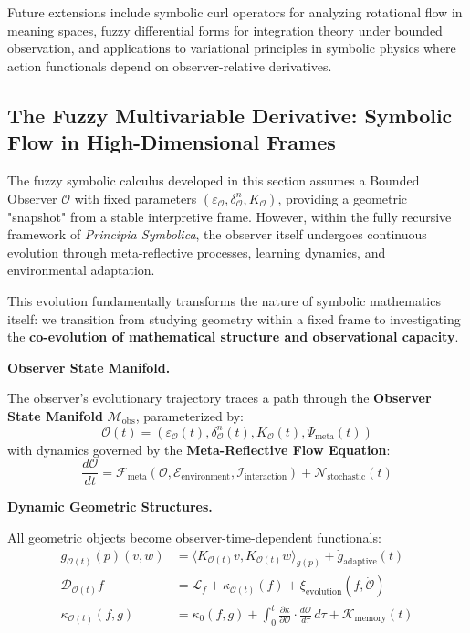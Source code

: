 Future extensions include symbolic curl operators for analyzing rotational flow in meaning spaces, fuzzy differential forms for integration theory under bounded observation, and applications to variational principles in symbolic physics where action functionals depend on observer-relative derivatives.\subsection{The Fuzzy Multivariable Derivative: Symbolic Flow in High-Dimensional Frames}

\begin{scholium}
\label{scholium:bk4_dynamics_of_observer_frame}

The fuzzy symbolic calculus developed in this section assumes a Bounded Observer $\mathcal{O}$ with fixed parameters $(\varepsilon_{\mathcal{O}}, \delta_{\mathcal{O}}^n, K_{\mathcal{O}})$, providing a geometric "snapshot" from a stable interpretive frame. However, within the fully recursive framework of \textit{Principia Symbolica}, the observer itself undergoes continuous evolution through meta-reflective processes, learning dynamics, and environmental adaptation.

This evolution fundamentally transforms the nature of symbolic mathematics itself: we transition from studying geometry within a fixed frame to investigating the \textbf{co-evolution of mathematical structure and observational capacity}.

\vspace{1em}
\noindent\textbf{Observer State Manifold.}

The observer's evolutionary trajectory traces a path through the \textbf{Observer State Manifold} $\mathcal{M}_{\text{obs}}$, parameterized by:
\[
\mathcal{O}(t) = (\varepsilon_{\mathcal{O}}(t), \delta_{\mathcal{O}}^n(t), K_{\mathcal{O}}(t), \Psi_{\text{meta}}(t))
\]
with dynamics governed by the \textbf{Meta-Reflective Flow Equation}:
\[
\frac{d\mathcal{O}}{dt} = \mathcal{F}_{\text{meta}}(\mathcal{O}, \mathcal{E}_{\text{environment}}, \mathcal{I}_{\text{interaction}}) + \mathcal{N}_{\text{stochastic}}(t)
\]

\vspace{1em}
\noindent\textbf{Dynamic Geometric Structures.}

All geometric objects become observer-time-dependent functionals:
\begin{align*}
g_{\mathcal{O}(t)}(p)(v,w) &= \langle K_{\mathcal{O}(t)} v, K_{\mathcal{O}(t)} w \rangle_{g(p)} + \dot{g}_{\text{adaptive}}(t) \\
\mathcal{D}_{\mathcal{O}(t)} f &= \mathcal{L}_f + \kappa_{\mathcal{O}(t)}(f) + \xi_{\text{evolution}}(f, \dot{\mathcal{O}}) \\
\kappa_{\mathcal{O}(t)}(f,g) &= \kappa_0(f,g) + \int_0^t \frac{\partial \kappa}{\partial \mathcal{O}} \cdot \frac{d\mathcal{O}}{d\tau} \, d\tau + \mathcal{K}_{\text{memory}}(t)
\end{align*}


\end{scholium}
